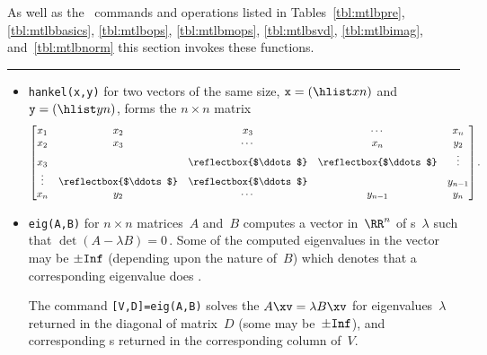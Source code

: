 \begin{table}
\caption{As well as the \script\ commands and operations listed in Tables~\ref{tbl:mtlbpre}, \ref{tbl:mtlbbasics}, \ref{tbl:mtlbops}, \ref{tbl:mtlbmops}, \ref{tbl:mtlbsvd}, \ref{tbl:mtlbimag}, and~\ref{tbl:mtlbnorm} this section invokes these functions.} \label{tbl:mtlbexpf}
\smallskip\hrule
\begin{minipage}{\linewidth}
\begin{itemize}
\item {}\verb|hankel(x,y)| for two 
vectors of the same size, \(\verb|x|=(\hlist xn)\) and \(\verb|y|=(\hlist yn)\), forms the \(n\times n\) matrix
\def\adots{\reflectbox{$\ddots$}}
\begin{equation*}
\begin{bmatrix} 
x_1&x_2&x_3&\cdots&x_n \\
x_2&x_3&\cdots&x_n&y_2\\
x_3&&\adots&\adots&\vdots\\
\vdots&\adots&\adots&&y_{n-1}\\
x_n&y_2&\cdots&y_{n-1}&y_n
\end{bmatrix}.
\end{equation*}

\item {}\verb|eig(A,B)| for \(n\times n\) matrices~\(A\) and~\(B\) computes a vector in~\(\RR^n\) of s~\(\lambda\) such that \(\det(A-\lambda B)=0\)\,.
Some of the computed eigenvalues in the vector may be \(\pm\verb|Inf|\) (depending upon the nature of~\(B\)) which denotes that a corresponding eigenvalue does .

The command \verb|[V,D]=eig(A,B)| solves the  \(A\xv=\lambda B\xv\) for eigenvalues~\(\lambda\) returned in the diagonal of matrix~\(D\) (some may be~\(\pm\verb|Inf|\)), and corresponding s returned in the corresponding column of~\(V\).


\end{itemize}
\end{minipage}
\end{table}
